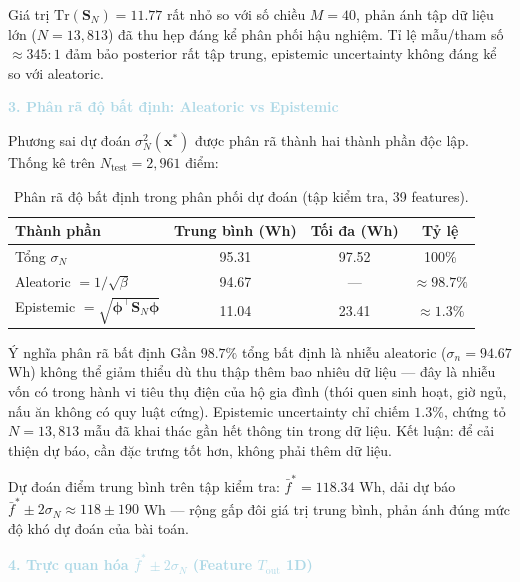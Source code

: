 Giá trị $\mathrm{Tr}(\mathbf{S}_N) = 11.77$ rất nhỏ so với số chiều $M = 40$,
phản ánh tập dữ liệu lớn ($N = 13{,}813$) đã thu hẹp đáng kể phân phối
hậu nghiệm. Tỉ lệ mẫu/tham số $\approx 345{:}1$ đảm bảo posterior rất
tập trung, epistemic uncertainty không đáng kể so với aleatoric.

\vspace{0.5em}
\noindent\textcolor{lightblue}{\textbf{3. Phân rã độ bất định: Aleatoric vs Epistemic}}
\vspace{0.5em}

Phương sai dự đoán $\sigma_N^2(\mathbf{x}^*)$ được phân rã thành hai
thành phần độc lập. Thống kê trên $N_{\text{test}} = 2{,}961$ điểm:

\begin{table}[H]
\centering
\caption{Phân rã độ bất định trong phân phối dự đoán (tập kiểm tra, 39 features).}
\label{tab:uncertainty_decomp}
\renewcommand{\arraystretch}{1.3}
\begin{tabular}{lccc}
\toprule
\textbf{Thành phần} & \textbf{Trung bình (Wh)} & \textbf{Tối đa (Wh)} & \textbf{Tỷ lệ} \\
\midrule
Tổng $\sigma_N$             & 95.31  & 97.52 & 100\% \\
Aleatoric $= 1/\sqrt{\beta}$ & 94.67  & ---   & $\approx 98.7\%$ \\
Epistemic $= \sqrt{\boldsymbol{\phi}^\top\mathbf{S}_N\boldsymbol{\phi}}$
                             & 11.04  & 23.41 & $\approx 1.3\%$ \\
\bottomrule
\end{tabular}
\end{table}

\begin{infobox}{Ý nghĩa phân rã bất định}
Gần $98.7\%$ tổng bất định là nhiễu aleatoric ($\sigma_n = 94.67$ Wh)
không thể giảm thiểu dù thu thập thêm bao nhiêu dữ liệu --- đây là
nhiễu vốn có trong hành vi tiêu thụ điện của hộ gia đình (thói quen sinh
hoạt, giờ ngủ, nấu ăn không có quy luật cứng). Epistemic uncertainty
chỉ chiếm $1.3\%$, chứng tỏ $N = 13{,}813$ mẫu đã khai thác gần hết
thông tin trong dữ liệu. Kết luận: để cải thiện dự báo, cần đặc trưng
tốt hơn, không phải thêm dữ liệu.
\end{infobox}

Dự đoán điểm trung bình trên tập kiểm tra:
$\bar{f}^* = 118.34$ Wh, dải dự báo $\bar{f}^* \pm 2\sigma_N \approx 118 \pm 190$ Wh
--- rộng gấp đôi giá trị trung bình, phản ánh đúng mức độ khó dự đoán của bài toán.

\vspace{0.5em}
\noindent\textcolor{lightblue}{\textbf{4. Trực quan hóa $\bar{f}^* \pm 2\sigma_N$ (Feature $T_{\text{out}}$ 1D)}}
\vspace{0.5em}

